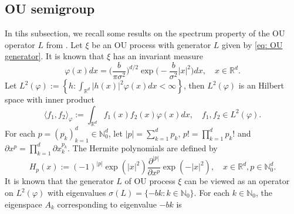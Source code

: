 \documentclass[12pt, a4paper]{amsart}
\theoremstyle{definition}
\numberwithin{equation}{section}
\begin{document}
\subsection{OU semigroup}
    In tihs subsection, we recall some results on the spectrum property of the OU operator $L$ from \cite{GD}.
    Let $\xi$ be an OU process with generator $L$ given by \eqref{eq: OU generator}. 
    It is known that $\xi$ has an invariant measure
\begin{equation}
\label{invariantdensity}
    \varphi(x)dx
    =\Big (\frac{b}{\pi \sigma^2}\Big )^{d/2}\exp \Big(-\frac{b}{\sigma^2}|x|^2 \Big)dx,
    \quad x\in \mathbb{R}^d.
\end{equation}
    Let $L^2(\varphi):= \left\{ h: \int_{\mathbb{R}^d} |h(x)|^2 \varphi(x) dx < \infty \right\}$, then $L^2(\varphi)$ is an Hilbert space with inner product
\begin{equation}
    \langle f_1, f_2 \rangle_{\varphi}
    := \int_{\mathbb{R}^d}f_1(x)f_2(x)\varphi(x) dx, \quad f_1,f_2 \in L^2(\varphi).
\end{equation}
    For each $p = (p_k)_{k = 1}^d \in \mathbb{N}_0^{d}$, let $|p|=\sum_{k=1}^d p_k$, $p!= \prod_{k= 1}^d p_k !$ and $\partial x^p = \prod_{k = 1}^d\partial x_k^{p_k}$.
    The Hermite polynomials are defined by
\begin{equation}
    H_p(x)
    :=(-1)^{|p|}\exp(|x|^2) \frac{\partial ^{|p|}}{\partial x^p} \exp(-|x|^2) ,
    \quad x\in \mathbb R^d, p \in \mathbb{N}_0^{d}.
\end{equation}
    It is known that the generator $L$ of OU process $\xi$ can be viewed as an operator on $L^2(\varphi)$ with eigenvalues $\sigma(L)= \{-bk: k \in \mathbb N_0\}$.
    For each $k \in \mathbb N_0$, the eigenspace $A_k$ corresponding to eigenvalue $-bk$ is
\end{document}
